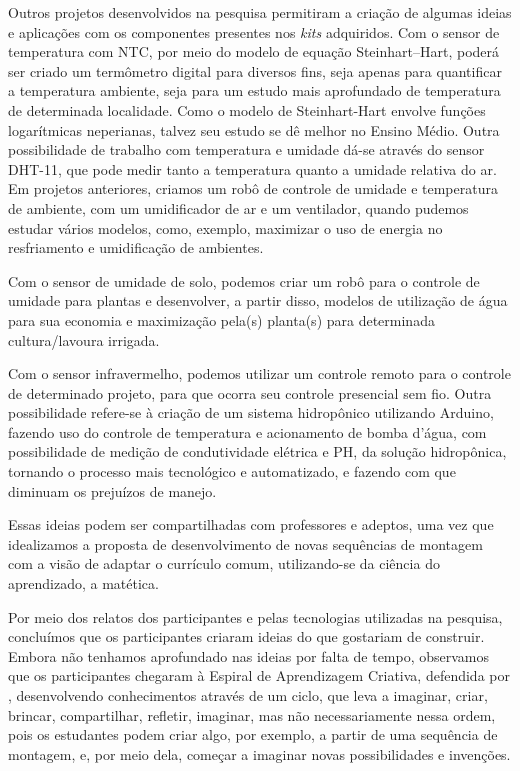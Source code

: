 \documentclass{textolivre}
\begin{document}
Outros projetos desenvolvidos na pesquisa permitiram a criação de algumas ideias e aplicações com os componentes presentes nos \textit{kits} adquiridos. Com o sensor de temperatura com NTC, por meio do modelo de equação Steinhart–Hart, poderá ser criado um termômetro digital para diversos fins, seja apenas para quantificar a temperatura ambiente, seja para um estudo mais aprofundado de temperatura de determinada localidade. Como o modelo de Steinhart-Hart envolve funções logarítmicas neperianas, talvez seu estudo se dê melhor no Ensino Médio. Outra possibilidade de trabalho com temperatura e umidade dá-se através do sensor DHT-11,  que pode medir tanto a temperatura quanto a umidade relativa do ar. Em projetos anteriores, criamos um robô de controle de umidade e temperatura de ambiente, com um umidificador de ar e um ventilador, quando pudemos estudar vários modelos, como, exemplo, maximizar o uso de energia no resfriamento e umidificação de ambientes. 

Com o sensor de umidade de solo, podemos criar um robô para o controle de umidade para plantas e desenvolver, a partir disso, modelos de utilização de água para sua economia e maximização pela(s) planta(s) para determinada cultura/lavoura irrigada.

Com o sensor infravermelho, podemos utilizar  um controle remoto para o controle de determinado projeto, para que ocorra seu controle presencial sem fio. Outra possibilidade refere-se à criação de um sistema hidropônico utilizando Arduino, fazendo uso do controle de temperatura e acionamento de bomba d’água, com possibilidade de medição de condutividade elétrica e PH, da solução hidropônica, tornando o processo mais tecnológico e automatizado, e fazendo com que diminuam os prejuízos de manejo.
 
Essas ideias podem ser compartilhadas com professores e adeptos, uma vez que idealizamos a proposta de desenvolvimento de novas sequências de montagem com a visão de adaptar o currículo comum, utilizando-se da ciência do aprendizado, a matética.

Por meio dos relatos dos participantes e pelas tecnologias utilizadas na pesquisa, concluímos que os participantes criaram ideias do que gostariam de construir. Embora não tenhamos aprofundado nas ideias por falta de tempo, observamos que os participantes chegaram à Espiral de Aprendizagem Criativa, defendida por \textcite{resnick2020},  desenvolvendo conhecimentos através de um ciclo, que leva a imaginar, criar, brincar, compartilhar, refletir, imaginar, mas não necessariamente nessa ordem, pois os estudantes podem criar algo, por exemplo, a partir de uma sequência de montagem, e, por meio dela, começar a imaginar novas possibilidades e invenções.
\end{document}
